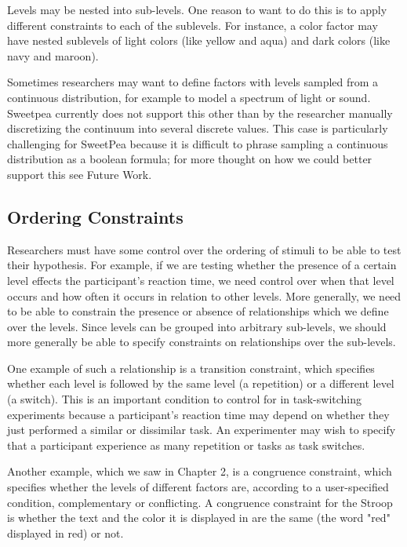 Levels may be nested into sub-levels. One reason to want to do this is to apply different constraints to each of the sublevels. For instance, a color factor may have nested sublevels of light colors (like yellow and aqua) and dark colors (like navy and maroon).

Sometimes researchers may want to define factors with levels sampled from a continuous distribution, for example to model a spectrum of light or sound. Sweetpea currently does not support this other than by the researcher manually discretizing the continuum into several discrete values. This case is particularly challenging for SweetPea because it is difficult to phrase sampling a continuous distribution as a boolean formula; for more thought on how we could better support this see Future Work.

\subsection{Ordering Constraints}

Researchers must have some control over the ordering of stimuli to be able to test their hypothesis. For example, if we are testing whether the presence of a certain level effects the participant's reaction time, we need control over when that level occurs and how often it occurs in relation to other levels. More generally, we need to be able to constrain the presence or absence of relationships which we define over the levels. Since levels can be grouped into arbitrary sub-levels, we should more generally be able to specify constraints on relationships over the sub-levels.

One example of such a relationship is a transition constraint, which specifies whether each level is followed by the same level (a repetition) or a different level (a switch). This is an important condition to control for in task-switching experiments because a participant's reaction time may depend on whether they just performed a similar or dissimilar task. An experimenter may wish to specify that a participant experience as many repetition or tasks as task switches.

Another example, which we saw in Chapter 2, is a congruence constraint, which specifies whether the levels of different factors are, according to a user-specified condition, complementary or conflicting. A congruence constraint for the Stroop is whether the text and the color it is displayed in are the same (the word "red" displayed in red) or not.

